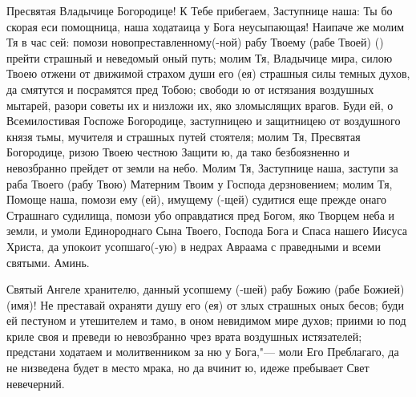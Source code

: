 \mychapterending


\begin{mymulticols}
 


Пресвятая Владычице Богородице! К Тебе прибегаем, Заступнице наша: Ты бо скорая еси помощница, наша ходатаица у Бога неусыпающая! Наипаче же молим Тя в час сей: помози новопреставленному(-ной) рабу Твоему (рабе Твоей) () прейти страшный и неведомый оный путь; молим Тя, Владычице мира, силою Твоею отжени от движимой страхом души его (ея) страшныя силы темных духов, да смятутся и посрамятся пред Тобою; свободи ю от истязания воздушных мытарей, разори советы их и низложи их, яко зломыслящих врагов. Буди ей, о Всемилостивая Госпоже Богородице, заступницею и защитницею от воздушного князя тьмы, мучителя и страшных путей стоятеля; молим Тя, Пресвятая Богородице, ризою Твоею честною Защити ю, да тако безбоязненно и невозбранно прейдет от земли на небо. Молим Тя, Заступнице наша, заступи за раба Твоего (рабу Твою) Матерним Твоим у Господа дерзновением; молим Тя, Помоще наша, помози ему (ей), имущему (-щей) судитися еще прежде онаго Страшнаго судилища, помози убо оправдатися пред Богом, яко Творцем неба и земли, и умоли Единороднаго Сына Твоего, Господа Бога и Спаса нашего Иисуса Христа, да упокоит усопшаго(-ую) в недрах Авраама с праведными и всеми святыми. Аминь.

\end{mymulticols}

\mychapterending


\begin{mymulticols}
 


Святый Ангеле хранителю, данный усопшему (-шей) рабу Божию (рабе Божией) (имя)! Не преставай охраняти душу его (ея) от злых страшных оных бесов; буди ей пестуном и утешителем и тамо, в оном невидимом мире духов; приими ю под криле своя и преведи ю невозбранно чрез врата воздушных истязателей; предстани ходатаем и молитвенником за ню у Бога,"--- моли Его Преблагаго, да не низведена будет в место мрака, но да вчинит ю, идеже пребывает Свет невечерний. 

\end{mymulticols}

\mychapterending


